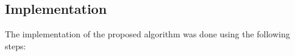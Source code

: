 \documentclass{article}
\begin{document}


\subsection{Implementation}

The implementation of the proposed algorithm was done using the following steps:
\end{document}
